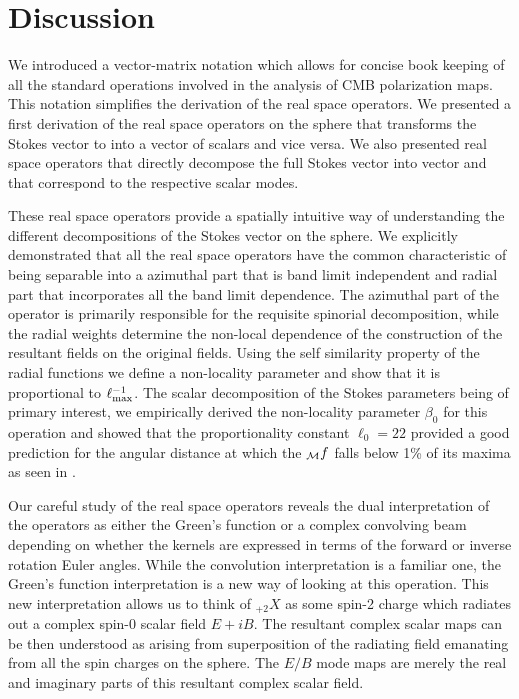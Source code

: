 \section{Discussion}\label{sec:discussion}

We introduced a vector-matrix notation which allows for concise book keeping of all the standard operations involved in the analysis of CMB polarization maps. This notation simplifies the derivation of the real space operators. We presented a first derivation of the real space operators on the sphere that transforms the Stokes vector \vp{} to into a vector of scalars \vs{} and vice versa. We also presented real space operators that directly decompose the full Stokes vector \vp{} into vector  and  that correspond to the respective scalar modes.

These real space operators provide a spatially intuitive way of understanding the different decompositions of the Stokes vector on the sphere. We explicitly  demonstrated that all the real space operators have the common characteristic  of being separable into a azimuthal part that is band limit independent and radial part that incorporates all the band limit dependence. The azimuthal part of the operator is primarily responsible for the requisite spinorial decomposition, while the radial weights determine the non-local dependence of the construction of the resultant fields on the original fields. Using the self similarity property of the radial functions we define a non-locality parameter and show that it is proportional to $\ell_{\rm max}^{-1}$. The scalar decomposition of the Stokes parameters being of primary interest,  we empirically derived the non-locality parameter $\beta_0$ for this operation and showed that the proportionality constant $\ell_{0}=22$ provided a good prediction for the angular distance at which the ${}_{\mathcal{M}}f$ falls below 1\% of its maxima as seen in .

Our careful study of the real space operators reveals the dual interpretation of the operators as either the Green's function or a complex convolving beam depending on whether the kernels are expressed in terms of the forward or inverse rotation Euler angles. While the convolution interpretation is a familiar one, the Green's function interpretation is a new way of looking at this operation. This new interpretation allows us to think of ${}_{+2}X$ as some spin-2 charge which radiates out a complex spin-0 scalar field $E+iB$. The resultant complex scalar maps can be then understood as arising from superposition of the radiating field emanating from all the spin charges on the sphere. The $E/B$ mode maps are merely the real and imaginary parts of this resultant complex scalar field.

